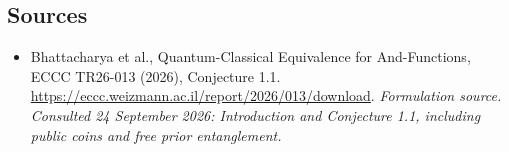 \documentclass[11pt]{article}
\begin{document}
\subsection{Sources}
\begin{itemize}
\item[S1]Bhattacharya et al., Quantum-Classical Equivalence for And-Functions, ECCC TR26-013 (2026), Conjecture 1.1.
\url{https://eccc.weizmann.ac.il/report/2026/013/download}.
\textit{Formulation source. Consulted 24 September 2026: Introduction and Conjecture 1.1, including public coins and free prior entanglement.}
\end{itemize}
\end{document}

